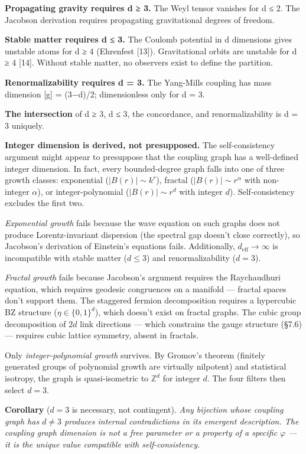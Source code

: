 \documentclass[
  11pt,
]{article}
\begin{document}
\textbf{Propagating gravity requires d ≥ 3.} The Weyl tensor vanishes
for d ≤ 2. The Jacobson derivation requires propagating gravitational
degrees of freedom.

\textbf{Stable matter requires d ≤ 3.} The Coulomb potential in d
dimensions gives unstable atoms for d ≥ 4 (Ehrenfest {[}13{]}).
Gravitational orbits are unstable for d ≥ 4 {[}14{]}. Without stable
matter, no observers exist to define the partition.

\textbf{Renormalizability requires d = 3.} The Yang-Mills coupling has
mass dimension {[}g{]} = (3−d)/2; dimensionless only for d = 3.

\textbf{The intersection} of d ≥ 3, d ≤ 3, the concordance, and
renormalizability is d = 3 uniquely.

\textbf{Integer dimension is derived, not presupposed.} The
self-consistency argument might appear to presuppose that the coupling
graph has a well-defined integer dimension. In fact, every
bounded-degree graph falls into one of three growth classes: exponential
(\(|B(r)| \sim k^r\)), fractal (\(|B(r)| \sim r^\alpha\) with
non-integer \(\alpha\)), or integer-polynomial (\(|B(r)| \sim r^d\) with
integer \(d\)). Self-consistency excludes the first two.

\emph{Exponential growth} fails because the wave equation on such graphs
does not produce Lorentz-invariant dispersion (the spectral gap doesn't
close correctly), so Jacobson's derivation of Einstein's equations
fails. Additionally, \(d_{\text{eff}} \to \infty\) is incompatible with
stable matter (\(d \leq 3\)) and renormalizability (\(d = 3\)).

\emph{Fractal growth} fails because Jacobson's argument requires the
Raychaudhuri equation, which requires geodesic congruences on a manifold
--- fractal spaces don't support them. The staggered fermion
decomposition requires a hypercubic BZ structure
(\(\eta \in \{0,1\}^d\)), which doesn't exist on fractal graphs. The
cubic group decomposition of \(2d\) link directions --- which constrains
the gauge structure (§7.6) --- requires cubic lattice symmetry, absent
in fractals.

Only \emph{integer-polynomial growth} survives. By Gromov's theorem
(finitely generated groups of polynomial growth are virtually nilpotent)
and statistical isotropy, the graph is quasi-isometric to
\(\mathbb{Z}^d\) for integer \(d\). The four filters then select
\(d = 3\).

\textbf{Corollary} (\(d = 3\) is necessary, not contingent). \emph{Any
bijection whose coupling graph has \(d \neq 3\) produces internal
contradictions in its emergent description. The coupling graph dimension
is not a free parameter or a property of a specific \(\varphi\) --- it
is the unique value compatible with self-consistency.}
\end{document}

